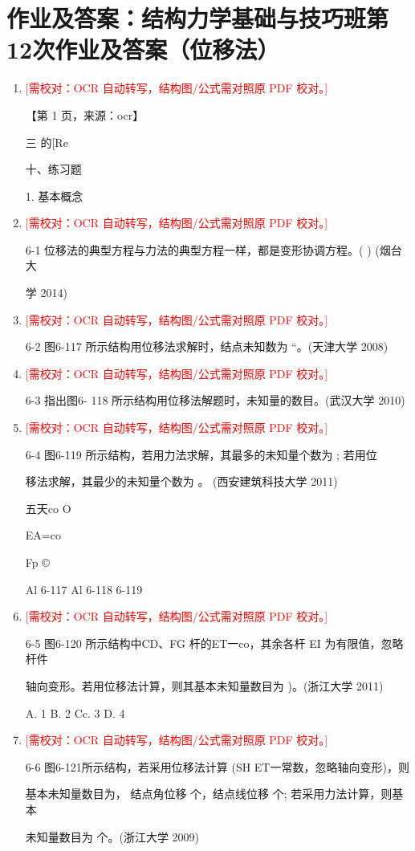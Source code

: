\documentclass[UTF8,12pt,a4paper,openany]{ctexbook}
\newcommand{\TODO}[1]{\textcolor{red}{[需校对：#1]}}
\begin{document}
\section{作业及答案：结构力学基础与技巧班第12次作业及答案（位移法）}
\begin{enumerate}[label=\textbf{\arabic*.},leftmargin=2em]
\item \TODO{OCR 自动转写，结构图/公式需对照原 PDF 校对。}\par 【第 1 页，来源：ocr】\par 三 的[Re\par 十、练习题\par 1. 基本概念
\item \TODO{OCR 自动转写，结构图/公式需对照原 PDF 校对。}\par 6-1 位移法的典型方程与力法的典型方程一样，都是变形协调方程。( ) (烟台大\par 学 2014)
\item \TODO{OCR 自动转写，结构图/公式需对照原 PDF 校对。}\par 6-2 图6-117 所示结构用位移法求解时，结点未知数为  “。(天津大学 2008)
\item \TODO{OCR 自动转写，结构图/公式需对照原 PDF 校对。}\par 6-3 指出图6- 118 所示结构用位移法解题时，未知量的数目。(武汉大学 2010)
\item \TODO{OCR 自动转写，结构图/公式需对照原 PDF 校对。}\par 6-4 图6-119 所示结构，若用力法求解，其最多的未知量个数为      ; 若用位\par 移法求解，其最少的未知量个数为       。 (西安建筑科技大学 2011)\par 五天co                                         O\par EA=co\par Fp                                             ©\par Al 6-117               Al 6-118            6-119
\item \TODO{OCR 自动转写，结构图/公式需对照原 PDF 校对。}\par 6-5 图6-120 所示结构中CD、FG 杆的ET一co，其余各杆 EI 为有限值，忽略杆件\par 轴向变形。若用位移法计算，则其基本未知量数目为  )。(浙江大学 2011)\par A. 1          B. 2          Cc. 3          D. 4
\item \TODO{OCR 自动转写，结构图/公式需对照原 PDF 校对。}\par 6-6 图6-121所示结构，若采用位移法计算 (SH ET一常数，忽略轴向变形)，则\par 基本未知量数目为， 结点角位移    个，结点线位移    个; 若采用力法计算，则基本\par 未知量数目为    个。(浙江大学 2009)

\end{enumerate}
\end{document}
